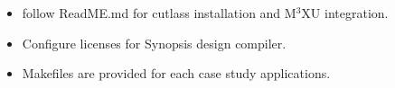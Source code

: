 \documentclass[conference]{IEEEtran}
\newcommand{\MPCMXU}[1]{M$^{3}$XU}
\begin{document}
\artcomp
\begin{itemize}
    \item follow ReadME.md for cutlass installation and \MPCMXU{} integration.
    \item Configure licenses for Synopsis design compiler.
    \item Makefiles are provided for each case study applications.
\end{itemize}








\end{document}
